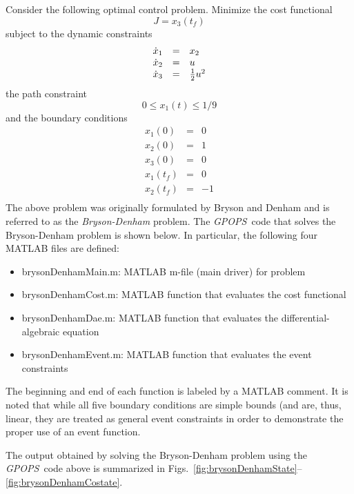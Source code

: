 \documentclass[10pt]{article}
\newcommand{\gpops}{{\em GPOPS}~}
\newenvironment{shadedframe}{%
  \def\FrameCommand{\fcolorbox{black}{shadecolor}}%
  \MakeFramed {\FrameRestore}}
{\endMakeFramed}
\begin{document}
Consider the following optimal control problem.  Minimize the cost functional
\begin{equation}
  J = x_3(t_f)
\end{equation}
subject to the dynamic constraints
\begin{equation}
  \begin{array}{lcl}
    \dot{x}_1 & = & x_2 \\
    \dot{x}_2 & = & u \\
    \dot{x}_3 & = & \frac{1}{2}u^2
  \end{array}
\end{equation}
the path constraint
\begin{equation}
  0 \leq x_1(t) \leq 1/9
\end{equation}
and the boundary conditions
\begin{equation}
  \begin{array}{lcl}
    x_1(0) & = & 0 \\
    x_2(0) & = & 1 \\
    x_3(0) & = & 0 \\
    x_1(t_f) & = & 0 \\
    x_2(t_f) & = & -1 \\
  \end{array}
\end{equation}
The above problem was originally formulated by Bryson and Denham \cite{Bryson2} and is referred to as the {\em Bryson-Denham} problem.  The
\gpops code that solves the Bryson-Denham problem is shown below.  In
particular, the following four MATLAB files are defined:
\begin{itemize}
  \item brysonDenhamMain.m: MATLAB m-file (main driver) for problem
  \item brysonDenhamCost.m: MATLAB function that evaluates the cost functional
  \item brysonDenhamDae.m: MATLAB function that evaluates the differential-algebraic equation
  \item brysonDenhamEvent.m: MATLAB function that evaluates the event constraints
\end{itemize}
The beginning and end of each function is labeled by a MATLAB
comment. It is noted that while all five boundary conditions are
simple bounds (and are, thus, linear, they are treated as general
event constraints in order to demonstrate the proper use of an event
function.
\scriptsize
\begin{shadedframe}



\end{shadedframe}
\normalsize
The output obtained by solving the Bryson-Denham problem using the
\gpops code above is summarized in
Figs.~\ref{fig:brysonDenhamState}--\ref{fig:brysonDenhamCostate}.  
\end{document}
